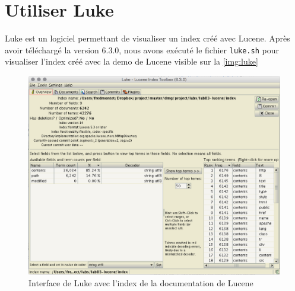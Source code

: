 \chapter{Utiliser Luke}

Luke est un logiciel permettant de visualiser un index créé avec Lucene. Après avoir téléchargé la version 6.3.0, nous avons exécuté le fichier \texttt{luke.sh} pour visualiser l’index créé avec la demo de Lucene visible sur la \autoref{img:luke}

\begin{figure}[H]
    \centering
    \includegraphics[width=0.7\linewidth, fbox]{img/luke.png}
    \caption{Interface de Luke avec l'index de la documentation de Lucene}
    \label{img:luke}
\end{figure}

